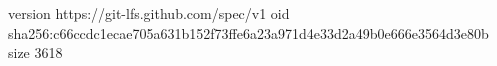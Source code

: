 version https://git-lfs.github.com/spec/v1
oid sha256:c66ccdc1ecae705a631b152f73ffe6a23a971d4e33d2a49b0e666e3564d3e80b
size 3618
